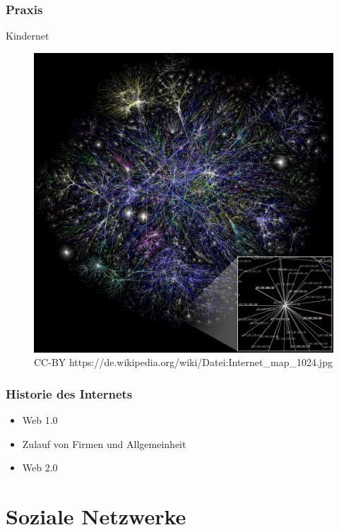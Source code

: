 \documentclass{beamer}
\begin{document}
\begin{frame}
  \frametitle{Praxis}
  Kindernet
  \begin{figure}
      \includegraphics[height=0.6\textheight]{img/internet_map.jpg}
      \caption{CC-BY https://de.wikipedia.org/wiki/Datei:Internet\_map\_1024.jpg}
  \end{figure}
\end{frame}

\begin{frame}
  \frametitle{Historie des Internets}
  \begin{itemize}
    \item<1-> Web 1.0
    \item<2-> Zulauf von Firmen und Allgemeinheit
    \item<3-> Web 2.0
  \end{itemize}
\end{frame}

\section{Soziale Netzwerke}
\end{document}
